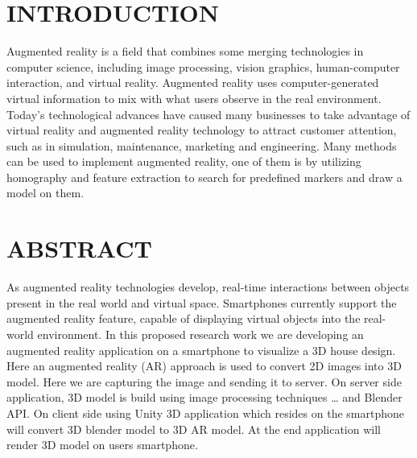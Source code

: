 \documentclass[12pt]{article}
\begin{document}
\tableofcontents
\pagestyle{fancy}
\fancyhead{} %
\fancyfoot{} %

\section{\uppercase{\large{Introduction}}}
Augmented reality is a field that combines some merging technologies in computer science, including image processing, vision graphics, human-computer interaction, and virtual reality. Augmented reality uses computer-generated virtual information to mix with what users observe in the real environment. Today’s technological advances have caused many businesses to take advantage of virtual reality and augmented reality technology to attract customer attention, such as in simulation, maintenance, marketing and engineering. Many methods can be used to implement augmented reality, one of them is by utilizing homography and feature extraction to search for predefined markers and draw a model on them.

\section{\uppercase{\large{Abstract}}}
As augmented reality technologies develop, real-time interactions between objects present in the real world and virtual space. Smartphones currently support the augmented reality feature, capable of displaying virtual objects into the real-world environment. In this proposed research work we are developing an augmented reality application on a smartphone to visualize a 3D house design. Here an augmented reality (AR) approach is used to convert 2D images into 3D model. Here we are capturing the image and sending it to server. On server side application, 3D model is build using image processing techniques … and Blender API. On client side using Unity 3D application which resides on the smartphone will convert 3D blender model to 3D AR model. At the end application will render 3D model on users smartphone.
\end{document}
